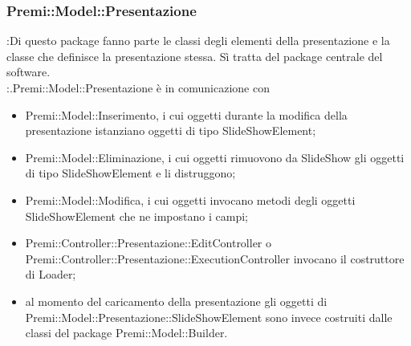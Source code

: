 {{{                    
                    
                     \subsubsection{Premi::Model::Presentazione}{
		\textbf{\tipo}:Di questo package fanno parte le classi degli elementi della presentazione e la classe che definisce la presentazione stessa. Sì tratta del package centrale del software.\\
		\textbf{\relaz}:.Premi::Model::Presentazione è in comunicazione con 
        \begin{itemize}
        \item Premi::Model::Inserimento, i cui oggetti durante la modifica della presentazione istanziano oggetti di tipo SlideShowElement;
        \item Premi::Model::Eliminazione, i cui oggetti rimuovono da SlideShow gli oggetti di tipo SlideShowElement e li distruggono;
        \item Premi::Model::Modifica, i cui oggetti invocano metodi degli oggetti SlideShowElement che ne impostano i campi;
        \item Premi::Controller::Presentazione::EditController o Premi::Controller::Presentazione::ExecutionController invocano il costruttore di Loader;
  		\item al momento del caricamento della presentazione gli oggetti di Premi::Model::Presentazione::SlideShowElement sono invece costruiti dalle classi del package Premi::Model::Builder.\\
  		\end{itemize}
	}}}}
